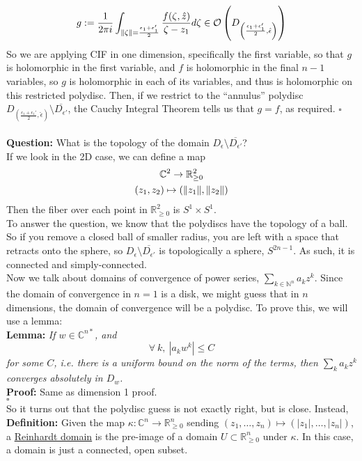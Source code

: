 \documentclass[12pt]{report}
\theoremstyle{definition}
\theoremstyle{remark}
\numberwithin{equation}{section}
\theoremstyle{definition}
\newcommand{\bb}[1]{\mathbb{#1}}
\DeclarePairedDelimiter\norm{\lVert}{\rVert}%
\newcommand{\mqed}{\hfill\newline\null \hfill$\square$\\ }
\begin{document}
$$
	g := \frac{1}{2\pi i} \int_{\norm{\zeta} = \frac{\epsilon_1 + \epsilon_1'}{2}} \frac{f(\zeta, \hat z)}{\zeta - z_1}d\zeta \in \mathcal{O}\left(D_{\left(\frac{\epsilon_1 + \epsilon_1'}{2},\hat \epsilon\right)}\right)
$$
So we are applying CIF in one dimension, specifically the first variable, so that $g$ is holomorphic in the first variable, and $f$ is holomorphic in the final $n-1$ variables, so $g$ is holomorphic in each of its variables, and thus is holomorphic on this restricted polydisc. Then, if we restrict to the ``annulus'' polydisc $D_{\left(\frac{\epsilon_1 + \epsilon_1'}{2},\hat \epsilon\right)}\setminus \overline{D_{\epsilon'}}$, the Cauchy Integral Theorem tells us that $g = f$, as required. \mqed
\\
\textbf{Question: }What is the topology of the domain $D_\epsilon \setminus \overline{D_{\epsilon'}}$? \\
If we look in the 2D case, we can define a map
\begin{gather*}
	\bb C^2 \to \bb R^2_{\geq 0}\\
	(z_1,z_2) \mapsto (\norm{z_1}, \norm{z_2})
\end{gather*}
Then the fiber over each point in $\bb R^2_{\geq 0}$ is $S^1 \times S^1$. \\
To answer the question, we know that the polydiscs have the topology of a ball. So if you remove a closed ball of smaller radius, you are left with a space that retracts onto the sphere, so $D_\epsilon \setminus \overline{D_{\epsilon'}}$ is topologically a sphere, $S^{2n-1}$. As such, it is connected and simply-connected. \\
Now we talk about domains of convergence of power series, $\sum_{k \in \bb N^n} a_k z^k$. Since the domain of convergence in $n = 1$ is a disk, we might guess that in $n$ dimensions, the domain of convergence will be a polydisc. To prove this, we will use a lemma:\\
\textbf{Lemma: }\textit{If $w \in \bb C^{n*}$, and}
$$
	\forall\ k,\ |a_k w^k| \leq C
$$
\textit{for some $C$, i.e. there is a uniform bound on the norm of the terms, then $\sum_k a_k z^k$ converges absolutely in $D_w$. }\\
\textbf{Proof: }Same as dimension 1 proof. \\
\mqed
So it turns out that the polydisc guess is not exactly right, but is close. Instead, \\
\textbf{Definition: }Given the map $\kappa: \bb C^n \to \bb R^n_{\geq 0}$ sending $(z_1,\dots,z_n) \mapsto (|z_1|,\dots,|z_n|)$, a \underline{Reinhardt domain} is the pre-image of a domain $U \subset \bb R^n_{\geq 0}$ under $\kappa$. In this case, a domain is just a connected, open subset. \\\\
\end{document}
